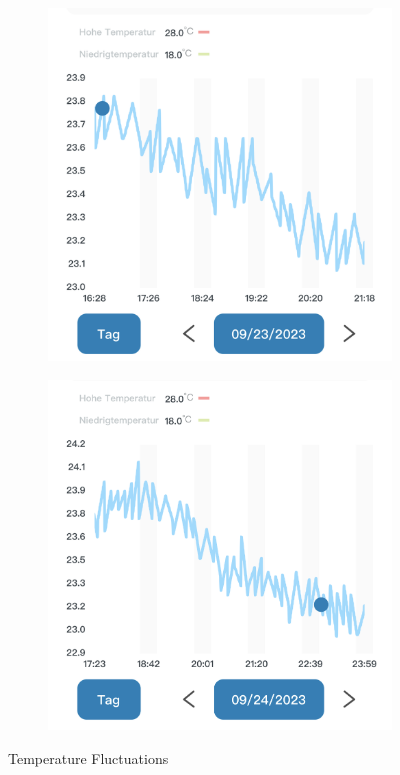 \documentclass{article}
\begin{document}
\begin{figure}[!h]
    \centering
    \begin{subfigure}[b]{.35\linewidth}
    \includegraphics[width=\linewidth]{9_23.png}
    \end{subfigure}
    \begin{subfigure}[b]{.35\linewidth}
    \includegraphics[width=\linewidth]{9_24.png}
    \end{subfigure}
    \caption{Temperature Fluctuations}
\end{figure}\\
\end{document}
